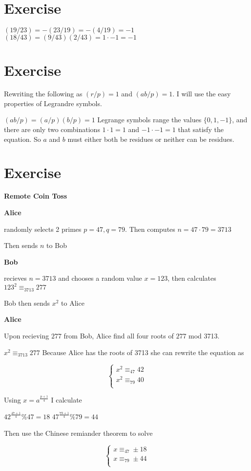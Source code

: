 \documentclass{article}
\begin{document}
\section{Exercise}
$(19/23) = -(23/19) = -(4/19) = -1$
\newline
$(18/43) = (9/43)(2/43) = 1\cdot -1 = -1$
\section{Exercise}
Rewriting the following as $(r/p) = 1$ and $(ab/p) = 1$. I will use the easy properties of Legrandre symbols.

$(ab/p) = (a/p)(b/p) = 1$ Legrange symbols range the values $\{0,1,-1\}$, and there are only
two combinations $1 \cdot 1 = 1$ and $-1 \cdot -1 = 1$ that satisfy the equation. So
$a$ and $b$ must either both be residues or neither can be residues.

\section{Exercise}
\textbf{Remote Coin Toss}

\textbf{Alice}

randomly selects 2 primes $p = 47, q = 79$. Then computes $n = 47\cdot 79 = 3713$

Then sends $n$ to Bob

\textbf{Bob}

recieves $n = 3713$ and chooses a random value $x = 123$, then calculates
$123^{2} \equiv_{3713} 277$

Bob then sends $x^{2}$ to Alice

\textbf{Alice}

Upon recieving $277$ from Bob, Alice find all four roots of $277$ mod 3713.

$x^{2} \equiv_{3713} 277$ Because Alice has the roots of 3713 she can rewrite the equation as

\[ \begin{cases}
	x^{2} \equiv_{47} 42 \\
	x^{2} \equiv_{79} 40 \\
	\end{cases}
\]

Using $x = a^{\frac{p+1}{4}}$ I calculate

$42^{\frac{47+1}{4}} \% 47 = 18$
$47^{\frac{79+1}{4}} \% 79 = 44$

Then use the Chinese remiander theorem to solve

\[ \begin{cases}
	x \equiv_{47} \pm 18 \\
	x \equiv_{79} \pm 44 \\
	\end{cases}
\]
\end{document}
